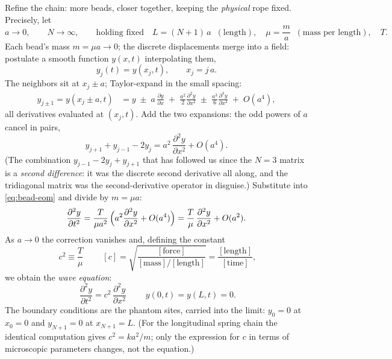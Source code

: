 \documentclass[11pt]{article}
\theoremstyle{plain}
\theoremstyle{definition}
\theoremstyle{remark}
\begin{document}
Refine the chain: more beads, closer together, keeping the \emph{physical}
rope fixed. Precisely, let
\begin{equation}
  a \to 0, \qquad N\to\infty,
  \qquad\text{holding fixed}\quad
  L = (N+1)\,a \;\;(\text{length}),
  \quad
  \mu = \frac{m}{a} \;\;(\text{mass per length}),
  \quad
  T .
\end{equation}
Each bead's mass $m = \mu a \to 0$; the discrete displacements merge into a
field: postulate a smooth function $y(x,t)$ interpolating them,
\begin{equation}
  y_j(t) = y(x_j, t), \qquad x_j = j\,a .
\end{equation}
The neighbors sit at $x_j \pm a$; Taylor-expand in the small spacing:
\begin{align}
  y_{j\pm1}
  = y(x_j \pm a, t)
  &= y \;\pm\; a\,\frac{\partial y}{\partial x}
   \;+\; \frac{a^2}{2}\frac{\partial^2 y}{\partial x^2}
   \;\pm\; \frac{a^3}{6}\frac{\partial^3 y}{\partial x^3}
   \;+\; O(a^4),
\end{align}
all derivatives evaluated at $(x_j,t)$. Add the two expansions: the odd
powers of $a$ cancel in pairs,
\begin{equation}
  y_{j+1} + y_{j-1} - 2y_j
  = a^2\,\frac{\partial^2 y}{\partial x^2} + O(a^4) .
  \label{eq:second-difference}
\end{equation}
(The combination $y_{j-1}-2y_j+y_{j+1}$ that has followed us since the
$N=3$ matrix is a \emph{second difference}: it was the discrete second
derivative all along, and the tridiagonal matrix was the second-derivative
operator in disguise.) Substitute into \eqref{eq:bead-eom} and divide by
$m = \mu a$:
\begin{equation}
  \frac{\partial^2 y}{\partial t^2}
  = \frac{T}{\mu a^2}\,\Bigl(a^2 \frac{\partial^2 y}{\partial x^2} + O(a^4)\Bigr)
  = \frac{T}{\mu}\,\frac{\partial^2 y}{\partial x^2} + O(a^2) .
\end{equation}
As $a\to0$ the correction vanishes and, defining the constant
\begin{equation}
  \boxed{\;c^2 \equiv \frac{T}{\mu}\;}
  \qquad
  [c] = \sqrt{\frac{[\text{force}]}{[\text{mass}]/[\text{length}]}}
  = \frac{[\text{length}]}{[\text{time}]},
\end{equation}
we obtain the \emph{wave equation}:
\begin{equation}
  \boxed{\;
  \frac{\partial^2 y}{\partial t^2} = c^2\,\frac{\partial^2 y}{\partial x^2}
  \;}
  \qquad
  y(0,t) = y(L,t) = 0 .
  \label{eq:wave}
\end{equation}
The boundary conditions are the phantom sites, carried into the limit:
$y_0 = 0$ at
$x_0 = 0$ and $y_{N+1}=0$ at $x_{N+1} = L$. (For the longitudinal spring
chain the identical computation gives $c^2 = ka^2/m$; only the expression
for $c$ in terms of microscopic parameters changes, not the equation.)
\end{document}
